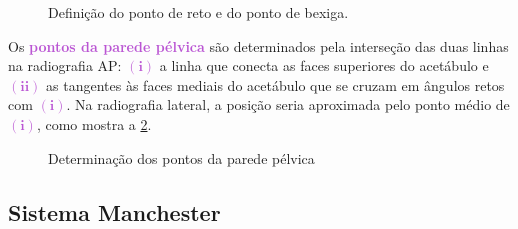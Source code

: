 \documentclass[11pt,a4paper]{article}
\begin{document}
	\begin{figure}[h]
		\centering
		\caption{Definição do ponto de reto e do ponto de bexiga.}
		\label{fig:icru38RetoEBexiga}
	\end{figure}


	Os \textcolor{MediumOrchid}{\textbf{pontos da parede pélvica}} são determinados pela interseção das duas linhas na radiografia AP: \textcolor{MediumOrchid}{$\mathbf{(i)}$} a linha que conecta as faces superiores do acetábulo e \textcolor{MediumOrchid}{$\mathbf{(ii)}$} as tangentes às faces mediais do acetábulo que se cruzam em ângulos retos com \textcolor{MediumOrchid}{$\mathbf{(i)}$}. Na radiografia lateral, a posição seria aproximada pelo ponto médio de \textcolor{MediumOrchid}{$\mathbf{(i)}$}, como mostra a \ref{fig:icru38paredePelvica}.

	\begin{figure}[h]
		\centering
		\caption{Determinação dos pontos da parede pélvica}
		\label{fig:icru38paredePelvica}
	\end{figure}

\subsection*{Sistema Manchester}
\end{document}
